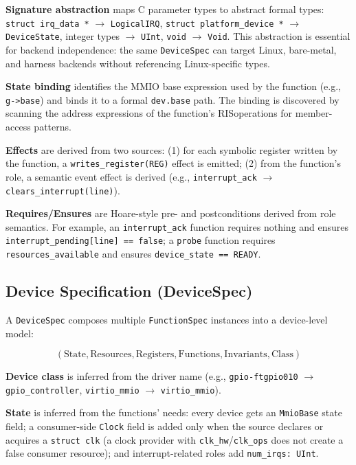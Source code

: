 \documentclass[sigconf,review]{acmart}
\newcommand{\rislang}{RIS}
\begin{document}
\textbf{Signature abstraction} maps C parameter types to abstract formal types: \texttt{struct irq\_data *} $\rightarrow$ \texttt{LogicalIRQ}, \texttt{struct platform\_device *} $\rightarrow$ \texttt{DeviceState}, integer types $\rightarrow$ \texttt{UInt}, \texttt{void} $\rightarrow$ \texttt{Void}. This abstraction is essential for backend independence: the same \texttt{DeviceSpec} can target Linux, bare-metal, and harness backends without referencing Linux-specific types.

\textbf{State binding} identifies the MMIO base expression used by the function (e.g., \texttt{g->base}) and binds it to a formal \texttt{dev.base} path. The binding is discovered by scanning the address expressions of the function's \rislang operations for member-access patterns.

\textbf{Effects} are derived from two sources: (1) for each symbolic register written by the function, a \texttt{writes\_register(REG)} effect is emitted; (2) from the function's role, a semantic event effect is derived (e.g., \texttt{interrupt\_ack} $\rightarrow$ \texttt{clears\_interrupt(line)}).

\textbf{Requires/Ensures} are Hoare-style pre- and postconditions derived from role semantics. For example, an \texttt{interrupt\_ack} function requires nothing and ensures \texttt{interrupt\_pending[line] == false}; a \texttt{probe} function requires \texttt{resources\_available} and ensures \texttt{device\_state == READY}.

\subsection{Device Specification (DeviceSpec)}

A \texttt{DeviceSpec} composes multiple \texttt{FunctionSpec} instances into a device-level model:

\[
(\text{State}, \text{Resources}, \text{Registers}, \text{Functions}, \text{Invariants}, \text{Class})
\]

\textbf{Device class} is inferred from the driver name (e.g., \texttt{gpio-ftgpio010} $\rightarrow$ \texttt{gpio\_controller}, \texttt{virtio\_mmio} $\rightarrow$ \texttt{virtio\_mmio}).

\textbf{State} is inferred from the functions' needs: every device gets an \texttt{MmioBase} state field; a consumer-side \texttt{Clock} field is added only when the source declares or acquires a \texttt{struct clk} (a clock provider with \texttt{clk\_hw}/\texttt{clk\_ops} does not create a false consumer resource); and interrupt-related roles add \texttt{num\_irqs: UInt}.
\end{document}
